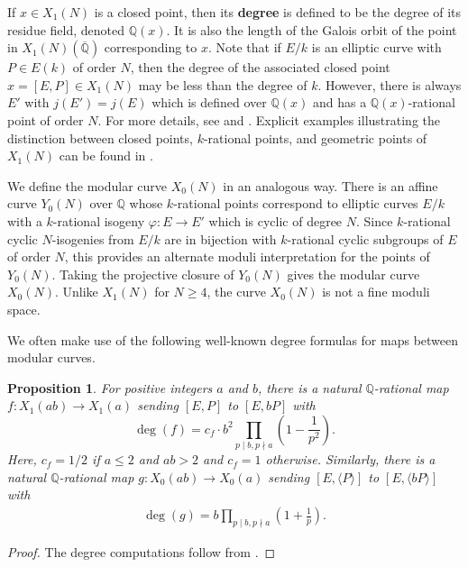 \documentclass{amsart}
\newtheorem{proposition}{Proposition}
\theoremstyle{definition}
\newcommand{\Q}{\mathbb{Q}}
\begin{document}
If $x\in X_1(N)$ is a closed point, then its \textbf{degree} is defined to be the degree of its residue field, denoted $\Q(x)$. It is also the length of the Galois orbit of the point in $X_1(N)(\overline{\Q})$ corresponding to $x$. Note that if $E/k$ is an elliptic curve with $P \in E(k)$ of order $N$, then the degree of the associated closed point $x=[E,P] \in X_1(N)$ may be less than the degree of $k$. However, there is always $E'$ with $j(E')=j(E)$ which is defined over $\Q(x)$ and has a $\Q(x)$-rational point of order $N$. For more details, see \cite[$\S3.2.3$]{Liu2002} and \cite[p. 274, Proposition VI.3.2]{DR}. Explicit examples illustrating the distinction between closed points, $k$-rational points, and geometric points of $X_1(N)$ can be found in \cite[$\S2.3$]{Algorithm2025}.

We define the modular curve $X_0(N)$ in an analogous way. There is an affine curve $Y_0(N)$ over $\Q$ whose $k$-rational points correspond to elliptic curves $E/k$ with a $k$-rational isogeny $\varphi:E \rightarrow E'$ which is cyclic of degree $N$. Since $k$-rational cyclic $N$-isogenies from $E/k$ are in bijection with $k$-rational cyclic subgroups of $E$ of order $N$, this provides an alternate moduli interpretation for the points of $Y_0(N)$. Taking the projective closure of $Y_0(N)$ gives the modular curve $X_0(N)$. Unlike $X_1(N)$ for $N \geq 4$, the curve $X_0(N)$ is not a fine moduli space.

We often make use of the following well-known degree formulas for maps between modular curves.

    \begin{proposition}\label{prop:degree}
                For positive integers $a$ and $b$, there is a natural $\Q$-rational map $f \colon X_1(ab) \rightarrow X_1(a)$ sending $[E,P]$ to $[E, bP]$ with
                \[
                    \deg(f)=
                    c_f\cdot b^2 \prod_{p \mid b, p \nmid a}\left( 1-\frac{1}{p^2} \right).             \]
                    Here, $c_f=1/2$ if $a \leq 2$ and $ab>2$ and $c_f=1$ otherwise. Similarly, there is a natural $\Q$-rational map $g:X_0(ab) \rightarrow X_0(a)$ sending $[E, \langle P \rangle]$ to $[E, \langle bP \rangle]$ with
        \begin{align*} \deg(g) =
            b \prod_{p \mid b, p \nmid a}\left(1 + \frac{1}{p}\right).
        \end{align*}
          \end{proposition}

          \begin{proof}
              The degree computations follow from \cite[p.66]{modular}.
          \end{proof}
\end{document}
